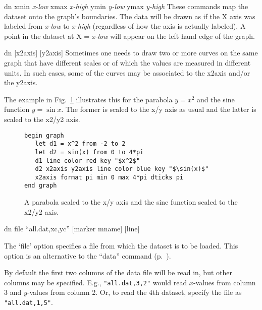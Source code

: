 \begin{commanddescription}
\item[{\sf dn xmin {\it x-low} xmax {\it x-high} ymin {\it y-low} ymax {\it y-high}}  ]
   
These commands map the dataset onto the graph's boundaries.
The data will be drawn as if the X axis was labeled from {\it x-low} to {\it
x-high} (regardless of how the axis is actually labeled).  A point in the
dataset at X = {\it x-low} will appear on the left hand edge of the graph.

\item[{\sf dn [x2axis] [y2axis]}]
 
Sometimes one needs to draw two or more curves on the same graph that have different scales or of which the values are measured in different units. In such cases, some of the curves may be associated to the x2axis and/or the y2axis.

The example in Fig.~\ref{fig:y2scale} illustrates this for the parabola $y = x^2$ and the sine function $y = \sin{x}$. The former is scaled to the x/y axis as usual and the latter is scaled to the x2/y2 axis.

\begin{figure}[tb]
\begin{minipage}[c]{9.2cm}
\begin{Verbatim}
begin graph
   let d1 = x^2 from -2 to 2
   let d2 = sin(x) from 0 to 4*pi
   d1 line color red key "$x^2$"
   d2 x2axis y2axis line color blue key "$\sin(x)$"
   x2axis format pi min 0 max 4*pi dticks pi
end graph
\end{Verbatim}
\end{minipage}
\hfill
\begin{minipage}[c]{7cm}
\mbox{}
\end{minipage}
\caption{\label{fig:y2scale}A parabola scaled to the x/y axis and the sine function scaled to the x2/y2 axis.}
\end{figure}

\item[{\sf dn file ``all.dat,xc,yc'' [marker {\sf mname}] [line]}   ]

The `file' option specifies a file from which the dataset is to be loaded. This option is an alternative to the ``data'' command (p.~\pageref{cmd:data}).

By default the first two columns of the data file will be read in, but other columns may be specified.
E.g., \verb+"all.dat,3,2"+ would read $x$-values from column 3 and $y$-values from column 2. Or, to read the 4th dataset, specify the file as \verb+"all.dat,1,5"+.


\end{commanddescription}
